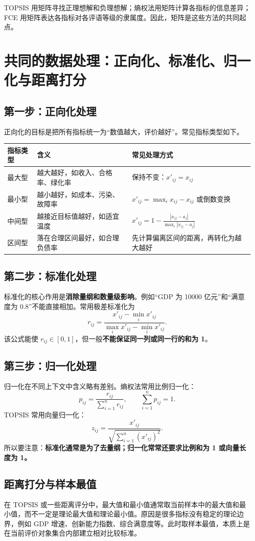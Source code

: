 \documentclass[UTF8,zihao=-4]{ctexart}
\begin{document}
TOPSIS 用矩阵寻找正理想解和负理想解；熵权法用矩阵计算各指标的信息差异；FCE 用矩阵表达各指标对各评语等级的隶属度。因此，矩阵是这些方法的共同起点。

\section{共同的数据处理：正向化、标准化、归一化与距离打分}
\subsection{第一步：正向化处理}
正向化的目标是把所有指标统一为“数值越大，评价越好”。常见指标类型如下。

\begin{longtable}{p{2.8cm}p{5.2cm}p{5.4cm}}
\toprule
指标类型 & 含义 & 常见处理方式 \\
\midrule
最大型 & 越大越好，如收入、合格率、绿化率 & 保持不变：$x'_{ij}=x_{ij}$ \\
最小型 & 越小越好，如成本、污染、故障率 & $x'_{ij}=\max_i x_{ij}-x_{ij}$ 或倒数变换 \\
中间型 & 越接近目标值越好，如适宜温度 & $x'_{ij}=1-\frac{|x_{ij}-a_j|}{\max_i |x_{ij}-a_j|}$ \\
区间型 & 落在合理区间最好，如合理负债率 & 先计算偏离区间的距离，再转化为越大越好 \\
\bottomrule
\end{longtable}

\subsection{第二步：标准化处理}
标准化的核心作用是\textbf{消除量纲和数量级影响}。例如“GDP 为 10000 亿元”和“满意度为 0.8”不能直接相加。常用极差标准化为
\[
r_{ij}=\frac{x'_{ij}-\min_i x'_{ij}}{\max_i x'_{ij}-\min_i x'_{ij}}.
\]
该公式能使 $r_{ij}\in[0,1]$，但一般\textbf{不能保证同一列或同一行的和为 1}。

\subsection{第三步：归一化处理}
归一化在不同上下文中含义略有差别。熵权法常用比例归一化：
\[
p_{ij}=\frac{r_{ij}}{\sum_{i=1}^n r_{ij}},\qquad \sum_{i=1}^n p_{ij}=1.
\]
TOPSIS 常用向量归一化：
\[
z_{ij}=\frac{x'_{ij}}{\sqrt{\sum_{i=1}^n (x'_{ij})^2}}.
\]
所以要注意：\textbf{标准化通常是为了去量纲；归一化常常还要求比例和为 1 或向量长度为 1。}

\subsection{距离打分与样本最值}
在 TOPSIS 或一些距离评分中，最大值和最小值通常取当前样本中的最大值和最小值，而不一定是理论最大值和理论最小值。原因是很多指标没有稳定的理论边界，例如 GDP 增速、创新能力指数、综合满意度等。此时取样本最值，本质上是在当前评价对象集合内部建立相对比较标准。
\end{document}

